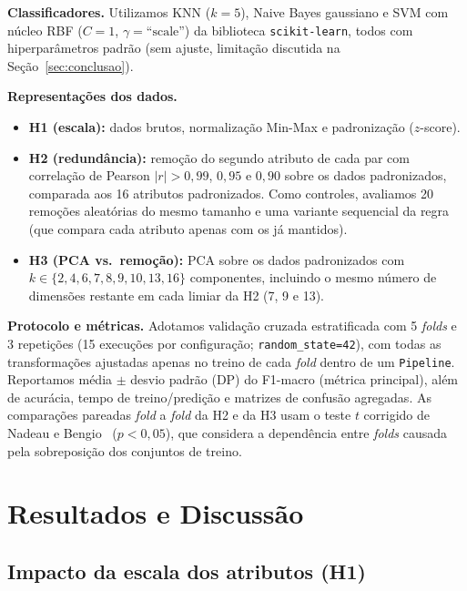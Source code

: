 \documentclass[11pt,a4paper]{article}
\begin{document}
\textbf{Classificadores.} Utilizamos KNN ($k=5$), Naive Bayes gaussiano e SVM com núcleo RBF ($C=1$, $\gamma=\text{``scale''}$) da biblioteca \texttt{scikit-learn}, 
todos com hiperparâmetros padrão (sem ajuste, limitação discutida na Seção~\ref{sec:conclusao}).

\textbf{Representações dos dados.}
\begin{itemize}
    \item \textbf{H1 (escala):} dados brutos, normalização Min-Max e padronização ($z$-score).
    \item \textbf{H2 (redundância):} remoção do segundo atributo de cada par com correlação de Pearson $|r|>0{,}99$, $0{,}95$ e $0{,}90$ sobre os dados 
    padronizados, comparada aos 16 atributos padronizados. Como controles, avaliamos 20 remoções aleatórias do mesmo tamanho e uma variante sequencial da 
    regra (que compara cada atributo apenas com os já mantidos).
    \item \textbf{H3 (PCA vs.\ remoção):} PCA sobre os dados padronizados com $k \in \{2, 4, 6, 7, 8, 9, 10, 13, 16\}$
    componentes, incluindo o mesmo número de dimensões restante em cada limiar da H2 (7, 9 e 13).
\end{itemize}

\textbf{Protocolo e métricas.} Adotamos validação cruzada estratificada com 5 \textit{folds} e 3 repetições (15 execuções por configuração; 
\texttt{random\_state=42}), com todas as transformações ajustadas apenas no treino de cada \textit{fold} dentro de um \texttt{Pipeline}. Reportamos 
média $\pm$ desvio padrão (DP) do F1-macro (métrica principal), além de acurácia, tempo de treino/predição e matrizes de confusão agregadas. As 
comparações pareadas \textit{fold} a \textit{fold} da H2 e da H3 usam o teste $t$ corrigido de Nadeau e Bengio~\cite{nadeau2003} ($p<0{,}05$),
que considera a dependência entre \textit{folds} causada pela sobreposição dos conjuntos de treino.

\section{Resultados e Discussão}

\subsection{Impacto da escala dos atributos (H1)}
\end{document}
